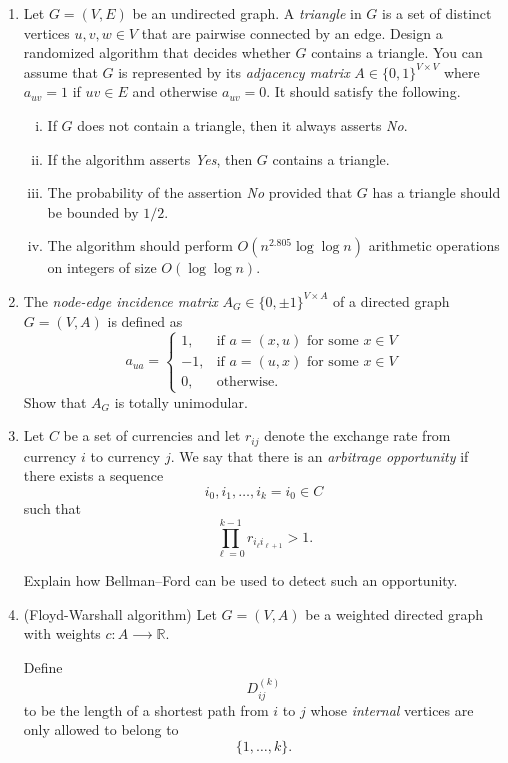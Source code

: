 \begin{enumerate}
\item \label{triangle-detection} Let $G = (V,E)$ be an undirected graph. A \emph{triangle} in $G$ is a set of distinct vertices $u,v,w ∈ V$ that are pairwise connected by an edge.
  Design a randomized algorithm that decides whether $G$ contains a triangle. You can assume that $G$ is represented by its \emph{adjacency matrix} $A ∈ \{0,1\}^{V × V}$ where  $a_{uv} = 1$ if $uv ∈E$ and otherwise $a_{uv} = 0$.  
  It should satisfy the following.
  \begin{enumerate}[i)] 
  \item If $G$ does not contain a triangle, then it always asserts \emph{No}.
  \item If the algorithm asserts \emph{Yes}, then $G$ contains a triangle.
  \item The probability of the assertion \emph{No} provided that $G$ has a triangle should be bounded by $1/2$.
  \item The algorithm should perform $O(n^{2.805} \log \log n )$ arithmetic operations on integers of size $O(\log \log n)$. 
  \end{enumerate}

\item \label{arbitrage} The \emph{node-edge incidence matrix} $A_G ∈ \{0, \pm 1\}^{V ×A}$ of a directed graph $G = (V,A)$   is defined as
  \begin{displaymath}
    a_{ua} = \begin{cases}
      1, & \text{if  } a= (x,u) \text{ for some } x ∈V\\
      -1, & \text{if  } a= (u,x) \text{ for some } x ∈V\\
0, & \text{otherwise.}
    \end{cases}    
  \end{displaymath}
  Show that $A_G$ is totally unimodular.
\item Let \(C\) be a set of currencies and let \(r_{ij}\) denote the exchange
rate from currency \(i\) to currency \(j\). We say that there is an
\emph{arbitrage opportunity} if there exists a sequence 
\[
i_0,i_1,\ldots,i_k=i_0 ∈ C
\]
such that
\[
\prod_{\ell=0}^{k-1} r_{i_\ell i_{\ell+1}}>1.
\]

 Explain how Bellman--Ford can be used
 to detect such an opportunity.

\item \label{Floyd} (Floyd-Warshall algorithm) Let $G = (V,A)$ be a weighted directed graph with weights $c: A ⟶ ℝ$.

  Define
\[
D^{(k)}_{ij}
\]
to be the length of a shortest path from \(i\) to \(j\) whose \emph{internal}
vertices are only allowed to belong to
\[
\{1,\dots,k\}.
\]


\end{enumerate}
